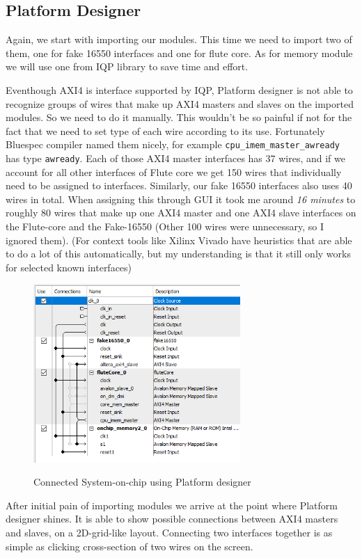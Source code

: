 \documentclass[12pt]{report}
\begin{document}
\subsection{Platform Designer}
Again, we start with importing our modules. 
This time we need to import two of them, one for fake 16550 interfaces and one for flute core. 
As for memory module we will use one from IQP library to save time and effort.
\par
Eventhough AXI4 is interface supported by IQP, Platform designer is not able to recognize groups of wires that make up AXI4 masters and slaves on the imported modules.
So we need to do it manually. This wouldn't be so painful if not for the fact that we need to set type of each wire according to its use. Fortunately Bluespec compiler named them nicely, for example \verb!cpu_imem_master_awready! has type \verb!awready!. Each of those AXI4 master interfaces has 37 wires, and if we account for all other interfaces of Flute core we get 150 wires that individually need to be assigned to interfaces. Similarly, our fake 16550 interfaces also uses 40 wires in total. When assigning this through GUI it took me around \emph{16 minutes} to roughly 80 wires that make up one AXI4 master and one AXI4 slave interfaces on the Flute-core and the Fake-16550 (Other 100 wires were unnecessary, so I ignored them). (For context tools like Xilinx Vivado have heuristics that are able to do a lot of this automatically, but my understanding is that it still only works for selected known interfaces)
\\
\begin{figure}[H]
    \caption{Connected System-on-chip using Platform designer}
    \includegraphics[width=0.7\textwidth]{images/Example2QSys.png} \\
    \centering
\end{figure}
After initial pain of importing modules we arrive at the point where Platform designer shines. It is able to show possible connections between AXI4 masters and slaves, on a 2D-grid-like layout. Connecting two interfaces together is as simple as clicking cross-section of two wires on the screen.  
\end{document}
